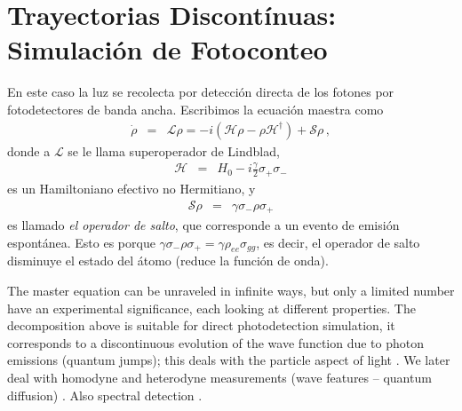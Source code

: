 \documentclass[twocolumn,aps,eqsecnum,showkeys,amsmath]{revtex4}
\newcommand{\mcH}{\mathcal{H}} 	%
\newcommand{\mcL}{\mathcal{L}}
\newcommand{\mcS}{\mathcal{S}}
\begin{document}
\section{Trayectorias Discont\'inuas: Simulaci\'on de Fotoconteo}
En este caso la luz se recolecta por detecci\'on directa de los fotones por 
fotodetectores de banda ancha. Escribimos la ecuaci\'on maestra como 
%
\begin{eqnarray} 	\label{MasterEqEffJ}
\dot{\rho} &=& \mcL \rho = - i ( \mcH \rho -\rho \mcH^{\dag} )  +\mcS \rho \,, 
\end{eqnarray}
donde a $\mcL$ se le llama superoperador de Lindblad, 
%
\begin{eqnarray} 
\mcH &=& H_0 - i \frac{\gamma}{2} \sigma_+ \sigma_-   
\end{eqnarray}
es un Hamiltoniano efectivo no Hermitiano, y  
%
\begin{eqnarray} 
\mcS \rho &=& \gamma \sigma_- \rho \sigma_+ 
\end{eqnarray}
es llamado \textit{el operador de salto}, que corresponde a un evento de 
emisi\'on espont\'anea. Esto es porque  
$\gamma \sigma _- \rho \sigma_ + = \gamma \rho_{ee} \sigma_{gg}$, es 
decir,  el operador de salto disminuye el estado del \'atomo (reduce la 
funci\'on de onda). 

The master equation can be unraveled in infinite ways, but only a limited 
number have an experimental significance, each looking at different 
properties. The decomposition above is suitable for direct photodetection 
simulation, it corresponds to a discontinuous evolution of the wave 
function due to photon emissions (quantum jumps); this deals with the 
particle aspect of light  \cite{Carmichael93,Carmichael02,DaCM92,DuZR92}. We later deal 
with homodyne and heterodyne measurements (wave features -- 
quantum diffusion) 
\cite{Carmichael93,Carmichael02,WiMi93a,WiMi93b,Percival98}. 
Also spectral detection \cite{TiCa92,Holland98}. 
\end{document}
